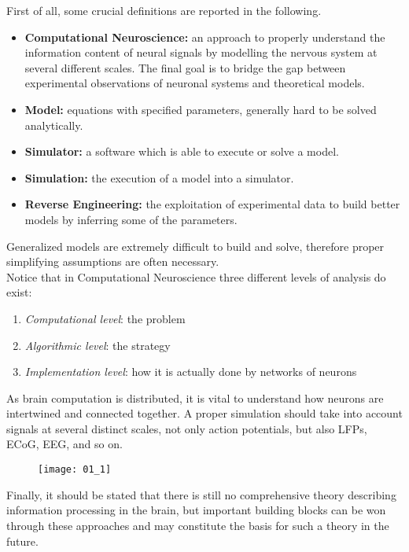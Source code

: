 First of all, some crucial definitions are reported in the following.
\begin{itemize}
    \item \textbf{Computational Neuroscience:} an approach to properly understand the information content of
          neural signals by modelling the nervous system at several different scales. The final goal
          is to bridge the gap between experimental observations of neuronal systems and theoretical
          models.
    \item \textbf{Model:} equations with specified parameters, generally hard to be solved
          analytically.
    \item \textbf{Simulator:} a software which is able to execute or solve a model.
    \item \textbf{Simulation:} the execution of a model into a simulator.
    \item \textbf{Reverse Engineering:} the exploitation of experimental data to build better models
          by inferring some of the parameters.
\end{itemize}
Generalized models are extremely difficult to build and solve, therefore proper simplifying
assumptions are often necessary.\\
Notice that in Computational Neuroscience three different levels of analysis do exist:
\begin{enumerate}
    \item \textit{Computational level}: the problem
    \item \textit{Algorithmic level}: the strategy
    \item \textit{Implementation level}: how it is actually done by networks of neurons
\end{enumerate}
As brain computation is distributed, it is vital to understand how neurons are intertwined and
connected together. A proper simulation should take into account signals at several distinct
scales, not only action potentials, but also LFPs, ECoG, EEG, and so on.
\begin{figure}[H]
    \texttt{[image: 01\_1]}
    \centering
\end{figure}
Finally, it should be stated that there is still no comprehensive theory describing information
processing in the brain, but important building blocks can be won through these approaches and
may constitute the basis for such a theory in the future.